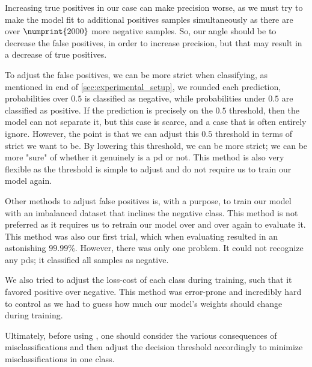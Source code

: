 Increasing true positives in our case can make precision worse, as we must try to make the model fit to additional positives samples simultaneously as there are over $\numprint{2000}$ more negative samples. So, our angle should be to decrease the false positives, in order to increase precision, but that may result in a decrease of true positives. 

To adjust the false positives, we can be more strict when classifying, as mentioned in end of \autoref{sec:experimental_setup}, we rounded each prediction, probabilities over $0.5$ is classified as negative, while probabilities under $0.5$ are classified as positive. If the prediction is precisely on the $0.5$ threshold, then the model can not separate it, but this case is scarce, and a case that is often entirely ignore. However, the point is that we can adjust this $0.5$ threshold in terms of strict we want to be. By lowering this threshold, we can be more strict; we can be more "sure" of whether it genuinely is a \ac{pd} or not. This method is also very flexible as the threshold is simple to adjust and do not require us to train our model again.

Other methods to adjust false positives is, with a purpose, to train our model with an imbalanced dataset that inclines the negative class. This method is not preferred as it requires us to retrain our model over and over again to evaluate it. This method was also our first trial, which when evaluating resulted in an astonishing $99.99\%$. However, there was only one problem. It could not recognize any \acp{pd}; it classified all samples as negative.

We also tried to adjust the loss-cost of each class during training, such that it favored positive over negative. This method was error-prone and incredibly hard to control as we had to guess how much our model's weights should change during training.

Ultimately, before using \project, one should consider the various consequences of misclassifications and then adjust the decision threshold accordingly to minimize misclassifications in one class.